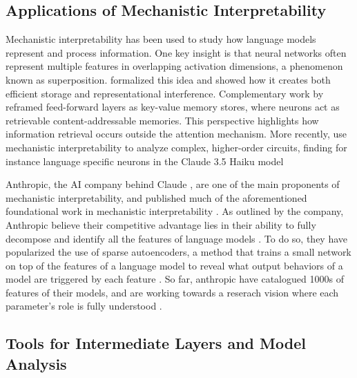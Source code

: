 
\subsection{Applications of Mechanistic Interpretability}

Mechanistic interpretability has been used to study how language models represent and process information. One key insight is that neural networks often represent multiple features in overlapping activation dimensions, a phenomenon known as superposition. \citet{elhage2022toy} formalized this idea and showed how it creates both efficient storage and representational interference. Complementary work by \citet{geva2021memory} reframed feed-forward layers as key-value memory stores, where neurons act as retrievable content-addressable memories. This perspective highlights how information retrieval occurs outside the attention mechanism. More recently, \citet{lindsey2025biology} use mechanistic interpretability to analyze complex, higher-order circuits, finding for instance language specific neurons in the Claude 3.5 Haiku model \citep{anthropic2024claude3}

Anthropic, the AI company behind Claude \citep{anthropic2024claude3}, are one of the main proponents of mechanistic interpretability, and published much of the aforementioned foundational work in mechanistic interpretability \citep{elhage2021mathematical, elhage2022toy, ameisen2025circuit}. As outlined by the company, Anthropic believe their competitive advantage lies in their ability to fully decompose and identify all the features of language models \citep{anthropic2023components}. To do so, they have popularized the use of sparse autoencoders, a method that trains a small network on top of the features of a language model to reveal what output behaviors of a model are triggered by each feature \citep{templeton2024scaling}. So far, anthropic have catalogued 1000s of features of their models, and are working towards a reserach vision where each parameter's role is fully understood \citep{anthropic2023components}.

\subsection{Tools for Intermediate Layers and Model Analysis}

